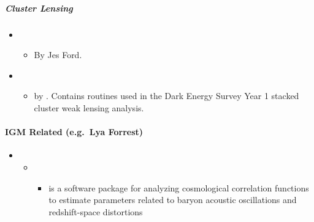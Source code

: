 \documentclass[letterpaper,10pt,english]{sphinxmanual}
\begin{document}
\subparagraph{Cluster Lensing}
\label{\detokenize{resource/astro/topics/cosmology_tools:cluster-lensing}}\begin{itemize}
\item {} 
\begin{itemize}
\item {} 
By Jes Ford. 

\end{itemize}

\item {} 
\begin{itemize}
\item {} 
by . Contains
routines used in the Dark Energy Survey Year 1 stacked cluster
weak lensing analysis.

\end{itemize}

\end{itemize}


\paragraph{IGM Related (e.g. Lya Forrest)}
\label{\detokenize{resource/astro/topics/cosmology_tools:igm-related-e-g-lya-forrest}}\begin{itemize}
\item {} 
\begin{itemize}
\item {} 
\begin{itemize}
\item {} 
 is a software package for analyzing cosmological
correlation functions to estimate parameters related to baryon
acoustic oscillations and redshift-space distortions

\end{itemize}

\end{itemize}

\end{itemize}
\end{document}
